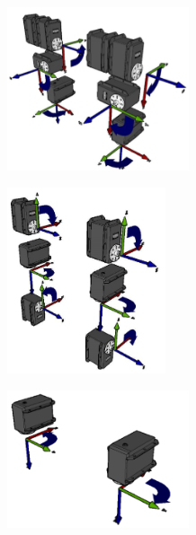 \documentclass[user_manual.tex]{subfiles}
\begin{document}
\begin{center}
\includegraphics[width=0.4\textwidth]{Figures/Hardware/Cinematica/Cine_7.png}
\end{center}

\begin{center}
\includegraphics[width=0.35\textwidth]{Figures/Hardware/Cinematica/Cine_8.png}
\end{center}

\begin{center}
\includegraphics[width=0.4\textwidth]{Figures/Hardware/Cinematica/Cine_9.png}
\end{center}
\end{document}
